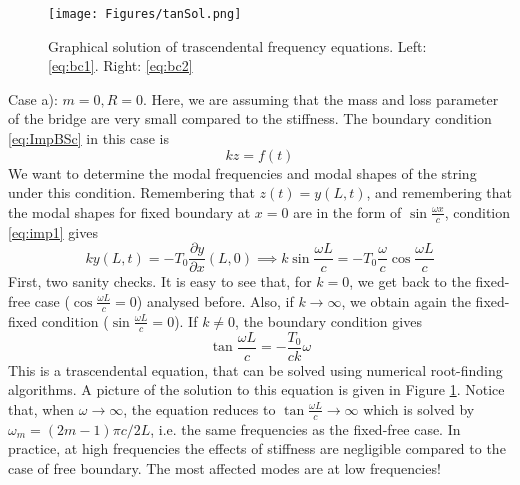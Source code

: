 \begin{figure}[hbt]
\texttt{[image: Figures/tanSol.png]}
\caption{Graphical solution of trascendental frequency equations. Left: \eqref{eq:bc1}. Right: \eqref{eq:bc2}}\label{fig:trasc}
\end{figure}

\medskip \medskip 
\noindent 
Case a): $m=0,R=0$. Here, we are assuming that the mass and loss parameter of the bridge are very small compared to the stiffness. The boundary condition \eqref{eq:ImpBSc} in this case is
\begin{equation}\label{eq:imp1}
k z = f(t)
\end{equation}
We want to determine the modal frequencies and modal shapes of the string under this condition. Remembering that $z(t) = y(L,t)$, and remembering that the modal shapes for fixed boundary at $x=0$ are in the form of $\sin \frac{\omega x}{c}$, condition \eqref{eq:imp1} gives
\begin{equation}
k y(L,t) = -T_0 \frac{\partial y}{\partial x}(L,0) \implies k \sin \frac{\omega L}{c} = - T_0 \frac{\omega}{c} \cos \frac{\omega L}{c}
\end{equation}
First, two sanity checks. It is easy to see that, for $k=0$, we get back to the fixed-free case ($\cos \frac{\omega L}{c} = 0$) analysed before. Also, if $k\rightarrow \infty$, we obtain again the fixed-fixed condition ($\sin \frac{\omega L}{c} = 0$). If $k \neq 0$, the boundary condition gives
\begin{equation}\label{eq:bc1}
\tan \frac{\omega L}{c} = - \frac{T_0}{ck}\omega
\end{equation}
This is a trascendental equation, that can be solved using numerical root-finding algorithms. A picture of the solution to this equation is given in Figure \ref{fig:trasc}. Notice that, when $\omega \rightarrow \infty$, the equation reduces to $\tan\frac{\omega L}{c}\rightarrow \infty$ which is solved by $\omega_m = (2m-1)\pi c / 2L$, i.e. the same frequencies as the fixed-free case. In practice, at high frequencies the effects of stiffness are negligible compared to the case of free boundary. The most affected modes are at low frequencies!


